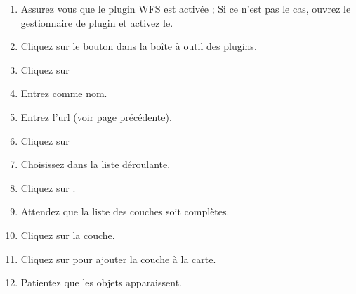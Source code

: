 \begin{enumerate}
  \item Assurez vous que le plugin WFS est activ\'ee ; Si ce n'est pas le cas,
ouvrez le gestionnaire de plugin et activez le.
  \item Cliquez sur le bouton  dans la bo\^ite \`a outil des plugins.
  \item Cliquez sur  
  \item Entrez  comme nom.
\item Entrez l'url (voir page pr\'ec\'edente).
\item Cliquez sur 
  \item Choisissez  dans la
liste d\'eroulante.
\item Cliquez sur .
\item Attendez que la liste des couches soit compl\`etes.
\item Cliquez sur la couche.
\item Cliquez sur  pour ajouter la couche \`a la carte.
\item Patientez que les objets apparaissent.
\end{enumerate}

